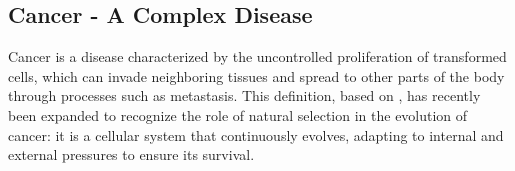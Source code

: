 



\subsection{Cancer - A Complex Disease}
Cancer is a disease characterized by the uncontrolled proliferation of
transformed cells, which can invade neighboring tissues and spread to other
parts of the body through processes such as metastasis. This definition, based
on \textcite{NCI2021,def_of_cancer_Brown2023}, has recently been expanded to
recognize the role of natural selection in the evolution of cancer: it is a
cellular system that continuously evolves, adapting to internal and external
pressures to ensure its survival.

